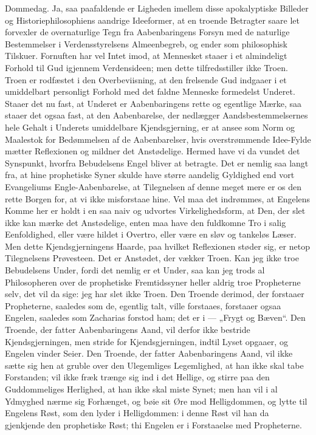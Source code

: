 \documentclass[12pt,a4paper]{book}
\begin{document}
Dommedag. Ja, saa paafaldende er Ligheden imellem disse apokalyptiske
Billeder og Historiephilosophiens aandrige Ideeformer, at en troende
Betragter saare let forvexler de overnaturlige Tegn fra Aabenbaringens
Forsyn med de naturlige Bestemmelser i Verdensstyrelsens Almeenbegreb,
og ender som philosophisk Tilskuer. Fornuften har vel Intet imod, at
Mennesket staaer i et almindeligt Forhold til Gud igjennem
Verdensideen; men dette tilfredsstiller ikke Troen. Troen er rodfæstet
i den Overbeviisning, at den frelsende Gud indgaaer i et umiddelbart
personligt Forhold med det faldne Menneske formedelst Underet. Staaer
det nu fast, at Underet er Aabenbaringens rette og egentlige Mærke, saa
staaer det ogsaa fast, at den Aabenbarelse, der nedlægger
Aandsbestemmelsernes hele Gehalt i Underets umiddelbare Kjendsgjerning,
er at ansee som Norm og Maalestok for
Bedømmelsen af de Aabenbarelser, hvis overstrømmende Idee-Fylde mætter
Reflexionen og mildner det Anstødelige. Hermed have vi da vundet det
Synspunkt, hvorfra Bebudelsens Engel bliver at betragte. Det er nemlig
saa langt fra, at hine prophetiske Syner skulde have større aandelig
Gyldighed end vort Evangeliums Engle-Aabenbarelse, at Tilegnelsen af
denne meget mere er os den rette Borgen for, at vi ikke misforstaae
hine. Vel maa det indrømmes, at Engelens Komme her er holdt i en saa
naiv og udvortes Virkelighedsform, at Den, der slet ikke kan mærke det
Anstødelige, enten maa have den fuldkomne Tro i salig Eenfoldighed,
eller være hildet i Overtro, eller være en sløv og tankeløs Læser. Men
dette Kjendsgjerningens Haarde, paa hvilket Reflexionen støder sig, er
netop Tilegnelsens Prøvesteen. Det er Anstødet, der vækker Troen. Kan
jeg ikke troe Bebudelsens Under, fordi det nemlig er et Under, saa kan
jeg trods al Philosopheren over de prophetiske Fremtidssyner heller
aldrig troe Propheterne selv, det vil da sige: jeg har slet ikke Troen.
Den Troende derimod, der forstaaer Propheterne, saaledes som de,
egentlig talt, ville forstaaes, forstaaer ogsaa Engelen, saaledes som
Zacharias forstod ham; det er i --- „Frygt og Bæven“. Den Troende, der
fatter Aabenbaringens Aand, vil derfor ikke bestride Kjendsgjerningen,
men stride for Kjendsgjerningen, indtil Lyset opgaaer, og Engelen
vinder Seier. Den Troende, der fatter Aabenbaringens Aand, vil ikke
sætte sig hen at gruble over den Ulegemliges Legemlighed, at han ikke
skal tabe Forstanden; vil ikke fræk trænge sig ind i det Hellige, og
stirre paa den Guddommeliges Herlighed, at han ikke skal miste Synet;
men han vil i al Ydmyghed nærme sig Forhænget, og bøie sit Øre mod
Helligdommen, og lytte til Engelens Røst, som den lyder i
Helligdommen: i denne Røst vil han da
gjenkjende den prophetiske Røst; thi Engelen er i Forstaaelse med
Propheterne.
\end{document}
